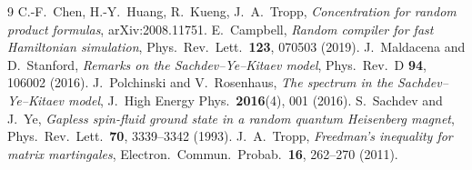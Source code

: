 ﻿\documentclass[12pt]{article}
\theoremstyle{plain}
\theoremstyle{definition}
\begin{document}
	\begin{thebibliography}{9}
		\setlength{\itemsep}{0pt}
		 C.-F.\ Chen, H.-Y.\ Huang, R.\ Kueng, J.\ A.\ Tropp, \emph{Concentration for random product formulas}, arXiv:2008.11751.
		 E.\ Campbell, \emph{Random compiler for fast Hamiltonian simulation}, Phys.\ Rev.\ Lett.\ \textbf{123}, 070503 (2019).
		 J.\ Maldacena and D.\ Stanford, \emph{Remarks on the Sachdev--Ye--Kitaev model}, Phys.\ Rev.\ D \textbf{94}, 106002 (2016).
		 J.\ Polchinski and V.\ Rosenhaus, \emph{The spectrum in the Sachdev--Ye--Kitaev model}, J.\ High Energy Phys.\ \textbf{2016}(4), 001 (2016).
		 S.\ Sachdev and J.\ Ye, \emph{Gapless spin-fluid ground state in a random quantum Heisenberg magnet}, Phys.\ Rev.\ Lett.\ \textbf{70}, 3339--3342 (1993).
		 J.\ A.\ Tropp, \emph{Freedman's inequality for matrix martingales}, Electron.\ Commun.\ Probab.\ \textbf{16}, 262--270 (2011).
	\end{thebibliography}
	
\end{document}
